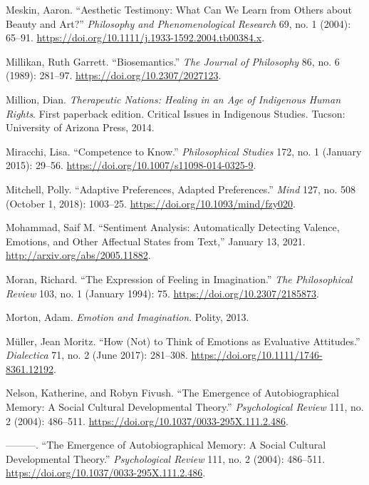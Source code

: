 \documentclass[phdthesis,12pt,final]{wuthesis}
\newlength{\cslhangindent}
\newenvironment{CSLReferences}[2] %
{\begin{list}{}{%
	\setlength{\itemindent}{0pt}
	\setlength{\leftmargin}{0pt}
	\setlength{\parsep}{0pt}
	\ifodd #1
	\setlength{\leftmargin}{\cslhangindent}
	\setlength{\itemindent}{-1\cslhangindent}
	\fi
	\setlength{\itemsep}{#2\baselineskip}}}
{\end{list}}
\theoremstyle{definition}
\theoremstyle{definition}
\theoremstyle{definition}
\theoremstyle{definition}
\theoremstyle{remark}
\begin{document}
\begin{CSLReferences}{1}{0}
Meskin, Aaron. {``Aesthetic {Testimony}: {What Can We Learn} from {Others} about {Beauty} and {Art}?''} \emph{Philosophy and Phenomenological Research} 69, no. 1 (2004): 65--91. \url{https://doi.org/10.1111/j.1933-1592.2004.tb00384.x}.

Millikan, Ruth Garrett. {``Biosemantics.''} \emph{The Journal of Philosophy} 86, no. 6 (1989): 281--97. \url{https://doi.org/10.2307/2027123}.

Million, Dian. \emph{Therapeutic {Nations}: {Healing} in an {Age} of {Indigenous Human Rights}}. First paperback edition. Critical {Issues} in {Indigenous Studies}. Tucson: University of Arizona Press, 2014.

Miracchi, Lisa. {``Competence to Know.''} \emph{Philosophical Studies} 172, no. 1 (January 2015): 29--56. \url{https://doi.org/10.1007/s11098-014-0325-9}.

Mitchell, Polly. {``Adaptive {Preferences}, {Adapted Preferences}.''} \emph{Mind} 127, no. 508 (October 1, 2018): 1003--25. \url{https://doi.org/10.1093/mind/fzy020}.

Mohammad, Saif M. {``Sentiment {Analysis}: {Automatically Detecting Valence}, {Emotions}, and {Other Affectual States} from {Text},''} January 13, 2021. \url{http://arxiv.org/abs/2005.11882}.

Moran, Richard. {``The {Expression} of {Feeling} in {Imagination}.''} \emph{The Philosophical Review} 103, no. 1 (January 1994): 75. \url{https://doi.org/10.2307/2185873}.

Morton, Adam. \emph{Emotion and {Imagination}}. Polity, 2013.

Müller, Jean Moritz. {``How ({Not}) to {Think} of {Emotions} as {Evaluative Attitudes}.''} \emph{Dialectica} 71, no. 2 (June 2017): 281--308. \url{https://doi.org/10.1111/1746-8361.12192}.

Nelson, Katherine, and Robyn Fivush. {``The {Emergence} of {Autobiographical Memory}: {A Social Cultural Developmental Theory}.''} \emph{Psychological Review} 111, no. 2 (2004): 486--511. \url{https://doi.org/10.1037/0033-295X.111.2.486}.

---------. {``The {Emergence} of {Autobiographical Memory}: {A Social Cultural Developmental Theory}.''} \emph{Psychological Review} 111, no. 2 (2004): 486--511. \url{https://doi.org/10.1037/0033-295X.111.2.486}.


\end{CSLReferences}
\end{document}
